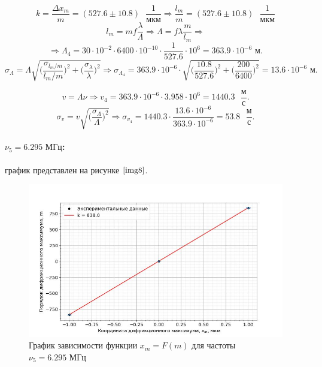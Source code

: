 \documentclass[a4paper,12pt]{article} %
\begin{document}
\[ k = \frac{\Delta x_{m}}{m} = (527.6\pm10.8)\text{ }\frac{1}{\text{мкм}} \Rightarrow \frac{l_{m}}{m} = (527.6\pm10.8)\text{ }\frac{1}{\text{мкм}} \]
\[ l_{m}=mf\frac{\lambda}{\Lambda} \Rightarrow \Lambda = f\lambda\frac{m}{l_{m}} \Rightarrow  \]
\[ \Rightarrow \Lambda_4 = 30\cdot10^{-2}\cdot6400\cdot10^{-10}\cdot\frac{1}{527.6}\cdot10^{6}=363.9\cdot10^{-6}\text{ м}. \]
\[ \sigma_{\Lambda} = \Lambda\sqrt{\Big(\frac{\sigma_{l_{m}/m}}{l_{m}/m}\Big)^2+ \Big(\frac{\sigma_{\lambda}}{\lambda}\Big)^2} \Rightarrow \sigma_{\Lambda_4} = 363.9\cdot10^{-6}\cdot\sqrt{\Big(\frac{10.8}{527.6}\Big)^2+\Big(\frac{200}{6400}\Big)^2} = 13.6\cdot10^{-6}\text{ м}. \]

\centering{}

\[ v=\Lambda\nu \Rightarrow v_4=363.9\cdot10^{-6}\cdot3.958\cdot10^{6}=1440.3\text{ }\frac{\text{м}}{\text{с}}. \]
\[ \sigma_{v} = v\sqrt{\Big(\frac{\sigma_{\Lambda}}{\Lambda}\Big)^2} \Rightarrow \sigma_{v_4} = 1440.3\cdot\frac{13.6\cdot10^{-6}}{363.9\cdot10^{-6}} = 53.8\text{ }\frac{\text{м}}{\text{с}}. \]

\centering{}

\newpage

\raggedright\paragraph{$\nu_5=6.295\text{ МГц}$:} график представлен на рисунке $\ref{img8}$.

\begin{figure}[h]
    \begin{center}
        \includegraphics[width=16cm]{image5.jpg}
    \end{center}
    \caption{График зависимости функции $x_m=F(m)$ для частоты $\nu_5=6.295\text{ МГц}$}
    \label{img8}
\end{figure}
\end{document}
